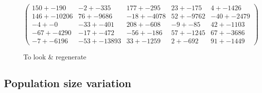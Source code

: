 \documentclass[]{report} %
\begin{document}
    \paragraph*{}
   

    \begin{figure}[H] 
            \centering
            \small
    $
          \begin{pmatrix}
                150 +- 190 & -2 +- 335 & 177 +- 295 & 23 +- 175 & 4 +- 1426 \\
                146 +- 10206 & 76 +- 9686 & -18 +- 4078 & 52 +- 9762 & -40 +- 2479 \\
                -4 +- 0 & -33 +- 401 & 208 +- 608 & -9 +- 85 & 42 +- 1103 \\
                -67 +- 4290 & -17 +- 472 & -56 +- 186 & 57 +- 1245 & 67 +- 3686 \\
                -7 +- 6196 & -53 +- 13893 & 33 +- 1259 & 2 +- 692 & 91 +- 1449 
           \end{pmatrix}
    $
            \caption{To look \& regenerate}
            \label{mat:ps300xg200xmr1-10-4xalt2}
    \end{figure}
    
    
    \subsection{Population size variation}
\end{document}
